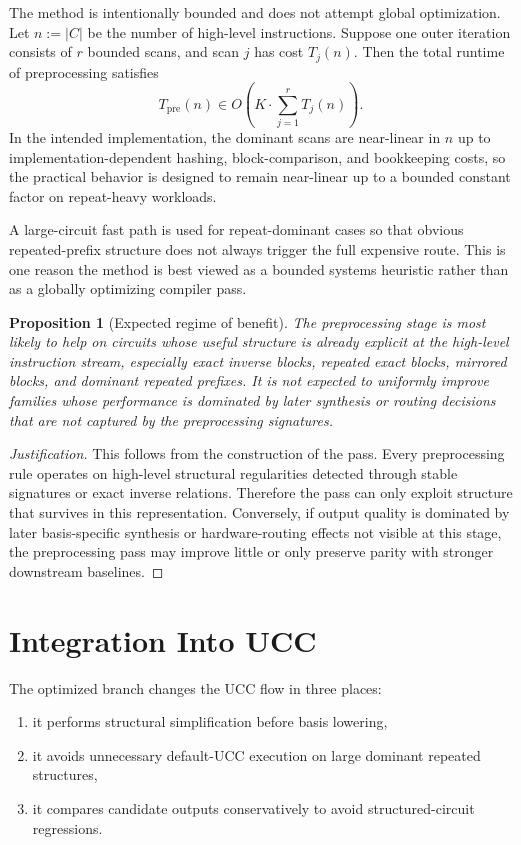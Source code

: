 \documentclass[11pt]{article}
\newtheorem{proposition}{Proposition}
\begin{document}
The method is intentionally bounded and does not attempt global optimization. Let $n := |C|$ be the number of high-level instructions. Suppose one outer iteration consists of $r$ bounded scans, and scan $j$ has cost $T_j(n)$. Then the total runtime of preprocessing satisfies
\[
T_{\mathrm{pre}}(n)
\in
O\!\left(
K \cdot \sum_{j=1}^{r} T_j(n)
\right).
\]
In the intended implementation, the dominant scans are near-linear in $n$ up to implementation-dependent hashing, block-comparison, and bookkeeping costs, so the practical behavior is designed to remain near-linear up to a bounded constant factor on repeat-heavy workloads.

A large-circuit fast path is used for repeat-dominant cases so that obvious repeated-prefix structure does not always trigger the full expensive route. This is one reason the method is best viewed as a bounded systems heuristic rather than as a globally optimizing compiler pass.

\begin{proposition}[Expected regime of benefit]
The preprocessing stage is most likely to help on circuits whose useful structure is already explicit at the high-level instruction stream, especially exact inverse blocks, repeated exact blocks, mirrored blocks, and dominant repeated prefixes. It is not expected to uniformly improve families whose performance is dominated by later synthesis or routing decisions that are not captured by the preprocessing signatures.
\end{proposition}

\begin{proof}[Justification]
This follows from the construction of the pass. Every preprocessing rule operates on high-level structural regularities detected through stable signatures or exact inverse relations. Therefore the pass can only exploit structure that survives in this representation. Conversely, if output quality is dominated by later basis-specific synthesis or hardware-routing effects not visible at this stage, the preprocessing pass may improve little or only preserve parity with stronger downstream baselines.
\end{proof}

\section{Integration Into UCC}

The optimized branch changes the UCC flow in three places:
\begin{enumerate}[leftmargin=1.5em]
    \item it performs structural simplification before basis lowering,
    \item it avoids unnecessary default-UCC execution on large dominant repeated structures,
    \item it compares candidate outputs conservatively to avoid structured-circuit regressions.
\end{enumerate}
\end{document}
